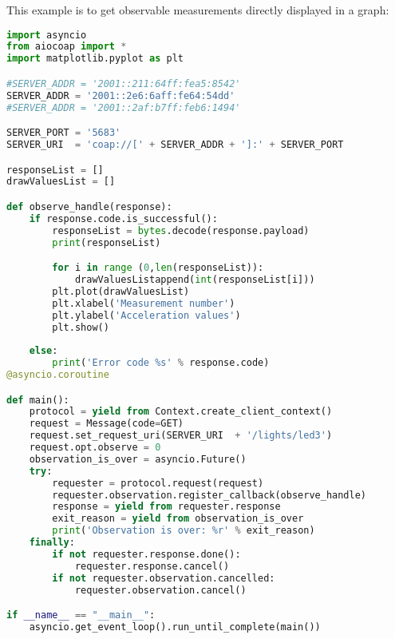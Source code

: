 This example is to get observable measurements directly displayed in a graph: 
\begin{lstlisting}[language=Python]
import asyncio
from aiocoap import *
import matplotlib.pyplot as plt

#SERVER_ADDR = '2001::211:64ff:fea5:8542'
SERVER_ADDR = '2001::2e6:6aff:fe64:54dd'
#SERVER_ADDR = '2001::2af:b7ff:feb6:1494'

SERVER_PORT = '5683'
SERVER_URI  = 'coap://[' + SERVER_ADDR + ']:' + SERVER_PORT

responseList = []
drawValuesList = []

def observe_handle(response):
	if response.code.is_successful(): 	
		responseList = bytes.decode(response.payload) 	
		print(responseList)

		for i in range (0,len(responseList)):
			drawValuesListappend(int(responseList[i]))
		plt.plot(drawValuesList)
		plt.xlabel('Measurement number')
		plt.ylabel('Acceleration values')
		plt.show()	
		
	else:
		print('Error code %s' % response.code)
@asyncio.coroutine

def main():
    protocol = yield from Context.create_client_context()
    request = Message(code=GET)
    request.set_request_uri(SERVER_URI  + '/lights/led3')
    request.opt.observe = 0
    observation_is_over = asyncio.Future()
    try:
        requester = protocol.request(request)
        requester.observation.register_callback(observe_handle)
        response = yield from requester.response
        exit_reason = yield from observation_is_over
        print('Observation is over: %r' % exit_reason)
    finally:
        if not requester.response.done():
            requester.response.cancel()
        if not requester.observation.cancelled:
            requester.observation.cancel()

if __name__ == "__main__":
    asyncio.get_event_loop().run_until_complete(main())

\end{lstlisting}



